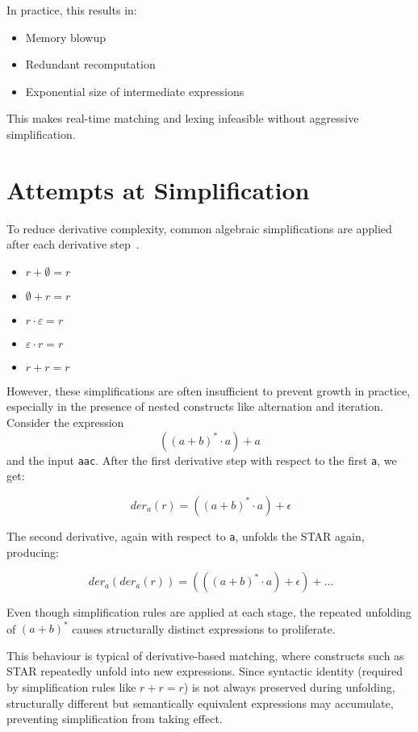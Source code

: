 \documentclass[11pt]{article}
\begin{document}
In practice, this results in:
\begin{itemize}
\item Memory blowup
\item Redundant recomputation
\item Exponential size of intermediate expressions
\end{itemize}

This makes real-time matching and lexing infeasible without aggressive simplification.

\section{Attempts at Simplification}

To reduce derivative complexity, common algebraic simplifications are applied after each derivative step~\cite{Brzozowski1964}.

\begin{itemize}
  \item $r + \emptyset = r$
  \item $\emptyset + r = r$
  \item $r \cdot \varepsilon = r$
  \item $\varepsilon \cdot r = r$
  \item $r + r = r$
\end{itemize}

However, these simplifications are often insufficient to prevent growth in practice, especially in the presence of nested constructs like alternation and iteration. Consider the expression \[((a + b)^* \cdot a) + a\] and the input \texttt{aac}. After the first derivative step with respect to the first \texttt{a}, we get:

\[
\ { {der}_a(r)} = ((a + b)^* \cdot a) + \epsilon
\]

The second derivative, again with respect to \texttt{a}, unfolds the STAR again, producing:

\[
\ {{der}_a( {der}_a(r))} = (((a + b)^* \cdot a) + \epsilon) + \dots
\]

Even though simplification rules are applied at each stage, the repeated unfolding of $(a + b)^*$ causes structurally distinct expressions to proliferate.

This behaviour is typical of derivative-based matching, where constructs such as STAR repeatedly unfold into new expressions. Since syntactic identity (required by simplification rules like $r + r = r$) is not always preserved during unfolding, structurally different but semantically equivalent expressions may accumulate, preventing simplification from taking effect.
\end{document}
